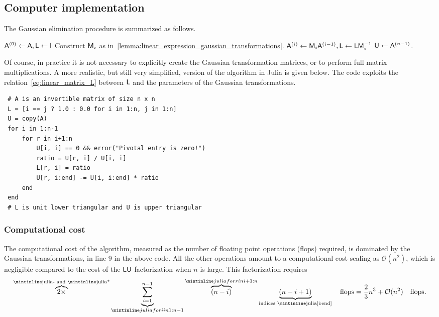 \subsection*{Computer implementation}%
\label{sub:computer_implementation}

The Gaussian elimination procedure is summarized as follows.

\begin{algorithmic}
\State $\mathsf A^{(0)} \gets \mathsf A, \mathsf L \gets \mathsf I$
    \State Construct $\mathsf M_{i}$ as in~\cref{lemma:linear_expression_gaussian_transformations}.
    \State $\mathsf A^{(i)} \gets \mathsf M_{i} \mathsf A^{(i-1)}, \mathsf L \gets \mathsf {\mathsf} \mathsf L \mathsf M_i^{-1}$
\EndFor
\State $\mathsf U \gets \mathsf A^{(n-1)}$.
\end{algorithmic}

Of course,
in practice it is not necessary to explicitly create the Gaussian transformation matrices,
or to perform full matrix multiplications.
A more realistic, but still very simplified, version of the algorithm in Julia is given below.
The code exploits the relation~\eqref{eq:linear_matrix_L} between $\mathsf L$ and the parameters of the Gaussian transformations.
\begin{verbatim}
 # A is an invertible matrix of size n x n
 L = [i == j ? 1.0 : 0.0 for i in 1:n, j in 1:n]
 U = copy(A)
 for i in 1:n-1
     for r in i+1:n
         U[i, i] == 0 && error("Pivotal entry is zero!")
         ratio = U[r, i] / U[i, i]
         L[r, i] = ratio
         U[r, i:end] -= U[i, i:end] * ratio
     end
 end
 # L is unit lower triangular and U is upper triangular
\end{verbatim}

\subsubsection*{Computational cost}%
\label{ssub:computational_cost}
The computational cost of the algorithm,
measured as the number of floating point operations (flops) required,
is dominated by the Gaussian transformations,
in line 9 in the above code.
All the other operations amount to a computational cost scaling as $\mathcal O(n^2)$,
which is negligible compared to the cost of the $\mathsf L \mathsf U$ factorization when $n$ is large.
This factorization requires
\[
    \overbrace{2\times}^{\text{\julia{-} and \julia{*}}} \underbrace{\sum_{i=1}^{n-1}}_{\julia{for i in 1:n-1}} \overbrace{(n - i)}^{\julia{for r in i+1:n}} \underbrace{(n - i + 1)}_{\text{indices \julia{[i:end]}}} \quad \mathrm{flops}
    = \frac{2}{3} n^3 + \mathcal O(n^2) \quad \mathrm{flops}.
\]


